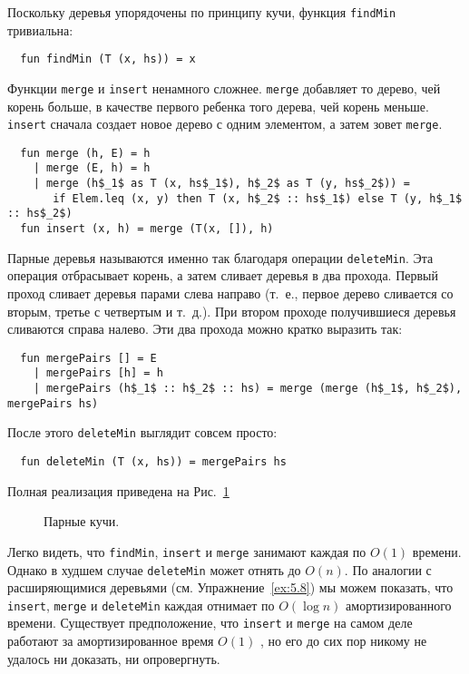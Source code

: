 Поскольку деревья упорядочены по принципу кучи, функция
\lstinline!findMin! тривиальна:
\begin{lstlisting}
  fun findMin (T (x, hs)) = x
\end{lstlisting}
Функции \lstinline!merge! и \lstinline!insert! ненамного
сложнее. \lstinline!merge! добавляет то дерево, чей корень больше, в
качестве первого ребенка того дерева, чей корень
меньше. \lstinline!insert! сначала создает новое дерево с одним
элементом, а затем зовет \lstinline!merge!.
\begin{lstlisting}
  fun merge (h, E) = h
    | merge (E, h) = h
    | merge (h$_1$ as T (x, hs$_1$), h$_2$ as T (y, hs$_2$)) =
       if Elem.leq (x, y) then T (x, h$_2$ :: hs$_1$) else T (y, h$_1$ :: hs$_2$)
  fun insert (x, h) = merge (T(x, []), h)
\end{lstlisting}
Парные деревья называются именно так благодаря операции
\lstinline!deleteMin!. Эта операция отбрасывает корень, а затем
сливает деревья в два прохода. Первый проход сливает деревья парами
слева направо (т.~е., первое дерево сливается со вторым, третье с
четвертым и т.~д.). При втором проходе получившиеся деревья сливаются
справа налево. Эти два прохода можно кратко выразить так:
\begin{lstlisting}
  fun mergePairs [] = E
    | mergePairs [h] = h
    | mergePairs (h$_1$ :: h$_2$ :: hs) = merge (merge (h$_1$, h$_2$), mergePairs hs)
\end{lstlisting}
После этого \lstinline!deleteMin! выглядит совсем просто:
\begin{lstlisting}
  fun deleteMin (T (x, hs)) = mergePairs hs
\end{lstlisting}
Полная реализация приведена на Рис.~\ref{fig:5.6}

\begin{figure}
  \centering

  \caption{Парные кучи.}
  \label{fig:5.6}
\end{figure}

Легко видеть, что \lstinline!findMin!, \lstinline!insert! и
\lstinline!merge! занимают каждая по $O(1)$ времени. Однако в худшем
случае \lstinline!deleteMin! может отнять до $O(n)$. По аналогии с
расширяющимися деревьями (см. Упражнение~\ref{ex:5.8}) мы можем
показать, что \lstinline!insert!, \lstinline!merge! и
\lstinline!deleteMin! каждая отнимает по $O(\log n)$ амортизированного
времени. Существует предположение, что \lstinline!insert! и
\lstinline!merge! на самом деле работают за амортизированное время
$O(1)$ \cite{Fredman-etal1986}, но его до сих пор никому не удалось ни
доказать, ни опровергнуть.

